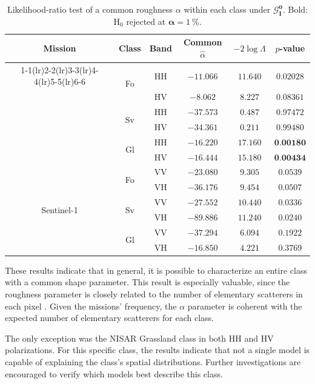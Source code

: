 \begin{table}[htbp]
\centering
\footnotesize
\renewcommand{\arraystretch}{1.15}
\begin{tabular*}{\columnwidth}{@{\extracolsep{\fill}}cccccc}
\toprule
Mission & Class & Band & Common $\widehat\alpha$ & $-2\log\Lambda$ & $p$-value \\
\cmidrule(r){1-1}\cmidrule(lr){2-2}\cmidrule(lr){3-3}\cmidrule(lr){4-4}\cmidrule(lr){5-5}\cmidrule(lr){6-6}
\multirow[c]{6}{*}{NISAR}
  & \multirow[c]{2}{*}{Fo} & $\text{HH}$ & $-11.066$ & $11.640$ & $0.02028$ \\
  &                        & $\text{HV}$ & $-8.062$  & $8.227$  & $0.08361$ \\
  & \multirow[c]{2}{*}{Sv} & $\text{HH}$ & $-37.573$ & $0.487$  & $0.97472$ \\
  &                        & $\text{HV}$ & $-34.361$ & $0.211$  & $0.99480$ \\
  & \multirow[c]{2}{*}{Gl} & $\text{HH}$ & $-16.220$ & $17.160$ & $\textbf{0.00180}$ \\
  &                        & $\text{HV}$ & $-16.444$ & $15.180$ & $\textbf{0.00434}$\\
\midrule
\multirow[c]{6}{*}{Sentinel-1}
  & \multirow[c]{2}{*}{Fo} & $\text{VV}$ & $-23.080$ & $9.305$  & $0.0539$ \\
  &                        & $\text{VH}$ & $-36.176$ & $9.454$  & $0.0507$ \\
  & \multirow[c]{2}{*}{Sv} & $\text{VV}$ & $-27.552$ & $10.440$ & $0.0336$ \\
  &                        & $\text{VH}$ & $-89.886$ & $11.240$ & $0.0240$ \\
  & \multirow[c]{2}{*}{Gl} & $\text{VV}$ & $-37.294$ & $6.094$  & $0.1922$ \\
  &                        & $\text{VH}$ & $-16.850$ & $4.221$  & $0.3769$ \\
\bottomrule
\end{tabular*}
\caption{Likelihood-ratio test of a common roughness $\alpha$ within each class under $\bm{\mathcal G}^{\bm 0}_{\bm I}$. Bold: H$_0$ rejected at $\bm\alpha=\qty{1}{\percent}$.}
\label{tab:common-alpha}
\end{table}
\vspace{0.3cm}

These results indicate that in general, it is possible to characterize an entire class with a common shape parameter.
This result is especially valuable, since the roughness parameter is closely related to the number of elementary scatterers in each pixel \cite{yue2021}.
Given the missions' frequency, the $\alpha$ parameter is coherent with the expected number of elementary scatterers for each class.

The only exception was the NISAR Grassland class in both $\text{HH}$ and $\text{HV}$ polarizations.
For this specific class, the results indicate that not a single model is capable of explaining the class's spatial distributions.
Further investigations are encouraged to verify which models best describe this class.

